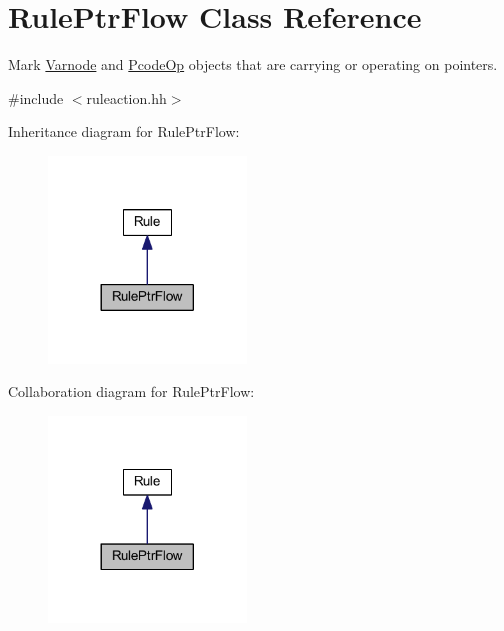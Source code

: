 \hypertarget{class_rule_ptr_flow}{}\section{Rule\+Ptr\+Flow Class Reference}
\label{class_rule_ptr_flow}


Mark \mbox{\hyperlink{class_varnode}{Varnode}} and \mbox{\hyperlink{class_pcode_op}{Pcode\+Op}} objects that are carrying or operating on pointers.  




{\ttfamily \#include $<$ruleaction.\+hh$>$}



Inheritance diagram for Rule\+Ptr\+Flow\+:
\nopagebreak
\begin{figure}[H]
\begin{center}
\leavevmode
\includegraphics[width=149pt]{class_rule_ptr_flow__inherit__graph}
\end{center}
\end{figure}


Collaboration diagram for Rule\+Ptr\+Flow\+:
\nopagebreak
\begin{figure}[H]
\begin{center}
\leavevmode
\includegraphics[width=149pt]{class_rule_ptr_flow__coll__graph}
\end{center}
\end{figure}
